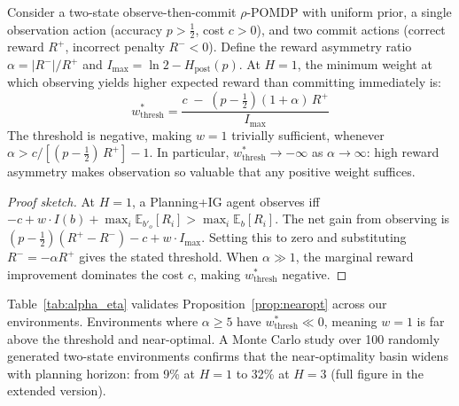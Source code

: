 \documentclass[runningheads]{llncs}
\begin{document}
\begin{proposition}
\label{prop:nearopt}
Consider a two-state observe-then-commit $\rho$-POMDP with uniform prior, a single observation action (accuracy $p > \tfrac{1}{2}$, cost $c > 0$), and two commit actions (correct reward $R^+$, incorrect penalty $R^- < 0$). Define the reward asymmetry ratio $\alpha = |R^-|/R^+$ and $I_{\max} = \ln 2 - H_{\text{post}}(p)$. At $H{=}1$, the minimum weight at which observing yields higher expected reward than committing immediately is:
\begin{equation*}
    w^*_{\mathrm{thresh}} = \frac{c \;-\; \left(p - \tfrac{1}{2}\right)(1 + \alpha)\,R^+}{\,I_{\max}\,}
\end{equation*}
The threshold is negative, making $w{=}1$ trivially sufficient, whenever $\alpha > c / [(p - \tfrac{1}{2})\,R^+] - 1$. In particular, $w^*_{\mathrm{thresh}} \to -\infty$ as $\alpha \to \infty$: high reward asymmetry makes observation so valuable that any positive weight suffices.
\end{proposition}
\begin{proof}[Proof sketch]
At $H{=}1$, a Planning+IG agent observes iff $-c + w \cdot I(b) + \max_i \mathbb{E}_{b'_o}[R_i] > \max_i \mathbb{E}_b[R_i]$. The net gain from observing is $(p - \frac{1}{2})(R^+ - R^-) - c + w \cdot I_{\max}$. Setting this to zero and substituting $R^- = -\alpha R^+$ gives the stated threshold. When $\alpha \gg 1$, the marginal reward improvement dominates the cost $c$, making $w^*_{\mathrm{thresh}}$ negative.
\end{proof}

Table~\ref{tab:alpha_eta} validates Proposition~\ref{prop:nearopt} across our environments. Environments where $\alpha \geq 5$ have $w^*_{\text{thresh}} \ll 0$, meaning $w{=}1$ is far above the threshold and near-optimal. A Monte Carlo study over 100 randomly generated two-state environments confirms that the near-optimality basin widens with planning horizon: from 9\% at $H{=}1$ to 32\% at $H{=}3$ (full figure in the extended version).
\end{document}
